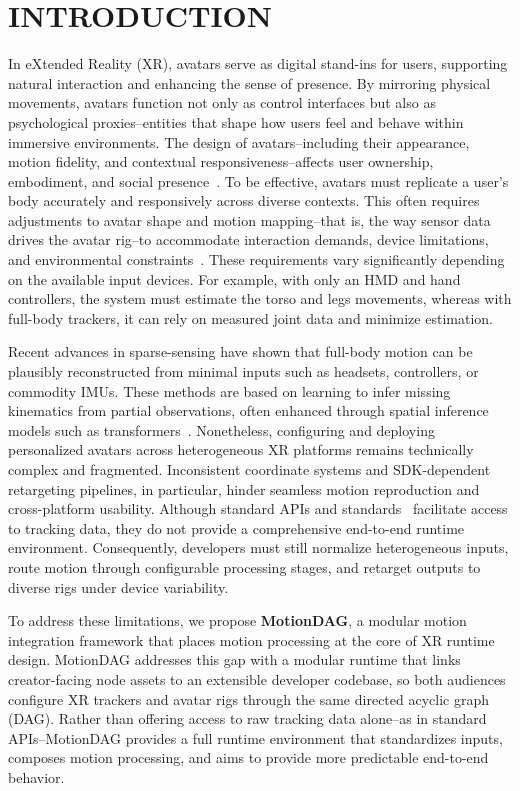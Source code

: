 \section{INTRODUCTION}
\label{sec:introduction}

In eXtended Reality (XR), avatars serve as digital stand-ins for users, supporting natural interaction and enhancing the sense of presence.
By mirroring physical movements, avatars function not only as control interfaces but also as psychological proxies--entities that shape how users feel and behave within immersive environments.
The design of avatars--including their appearance, motion fidelity, and contextual responsiveness--affects user ownership, embodiment, and social presence~\cite{yun2023animationfidelity}. 
To be effective, avatars must replicate a user’s body accurately and responsively across diverse contexts.
This often requires adjustments to avatar shape and motion mapping--that is, the way sensor data drives the avatar rig--to accommodate interaction demands, device limitations, and environmental constraints~\cite{cheymol2023beyond}.
These requirements vary significantly depending on the available input devices.
For example, with only an HMD and hand controllers, the system must estimate the torso and legs movements, whereas with full-body trackers, it can rely on measured joint data and minimize estimation.

Recent advances in sparse-sensing have shown that full-body motion can be plausibly reconstructed from minimal inputs such as headsets, controllers, or commodity IMUs.
These methods are based on learning to infer missing kinematics from partial observations, often enhanced through spatial inference models such as transformers~\cite{jiang2022avatarposer,yang2024divatrack}.
Nonetheless, configuring and deploying personalized avatars across heterogeneous XR platforms remains technically complex and fragmented. 
Inconsistent coordinate systems and SDK-dependent retargeting pipelines, in particular, hinder seamless motion reproduction and cross-platform usability.
Although standard APIs and standards~\cite{khronos_openxr_1_0,openxr_ext_hand} facilitate access to tracking data, they do not provide a comprehensive end-to-end runtime environment.
Consequently, developers must still normalize heterogeneous inputs, route motion through configurable processing stages, and retarget outputs to diverse rigs under device variability.

To address these limitations, we propose \textbf{MotionDAG}, a modular motion integration framework that places motion processing at the core of XR runtime design.
MotionDAG addresses this gap with a modular runtime that links creator-facing node assets to an extensible developer codebase, so both audiences configure XR trackers and avatar rigs through the same directed acyclic graph (DAG). 
Rather than offering access to raw tracking data alone--as in standard APIs--MotionDAG provides a full runtime environment that standardizes inputs, composes motion processing, and aims to provide more predictable end-to-end behavior.

